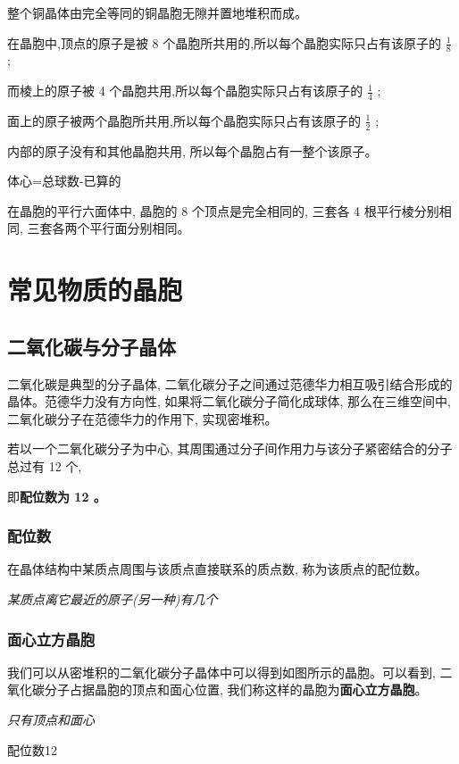 \documentclass[10pt,cn]{elegantbook}
\begin{document}
 整个铜晶体由完全等同的铜晶胞无隙并置地堆积而成。
 
 在晶胞中,顶点的原子是被 8 个晶胞所共用的,所以每个晶胞实际只占有该原子的 \(\frac{1}{8}\) ;
 
 而棱上的原子被 4 个晶胞共用,所以每个晶胞实际只占有该原子的 \(\frac{1}{4}\) ;
 
 面上的原子被两个晶胞所共用,所以每个晶胞实际只占有该原子的 \(\frac{1}{2}\) ;
 
 内部的原子没有和其他晶胞共用, 所以每个晶胞占有一整个该原子。
 
 体心=总球数-已算的
 
 在晶胞的平行六面体中, 晶胞的 8 个顶点是完全相同的, 三套各 4 根平行棱分别相同, 三套各两个平行面分别相同。
 
 
 \section{常见物质的晶胞}
 
 \subsection{二氧化碳与分子晶体}
 
 二氧化碳是典型的分子晶体, 二氧化碳分子之间通过范德华力相互吸引结合形成的晶体。范德华力没有方向性, 如果将二氧化碳分子简化成球体, 那么在三维空间中, 二氧化碳分子在范德华力的作用下, 实现密堆积。
 
 若以一个二氧化碳分子为中心, 其周围通过分子间作用力与该分子紧密结合的分子总过有 12 个,
 
 即\textbf{配位数为 12 。}
 
\subsubsection{配位数}

 在晶体结构中某质点周围与该质点直接联系的质点数, 称为该质点的配位数。
 
 \textit{某质点离它最近的原子(另一种)有几个}
 
 \subsubsection{面心立方晶胞}
 
 我们可以从密堆积的二氧化碳分子晶体中可以得到如图所示的晶胞。可以看到, 二氧化碳分子占据晶胞的顶点和面心位置, 我们称这样的晶胞为\textbf{面心立方晶胞}。
 
\textit{ 只有顶点和面心}
 
 配位数12
 
\end{document}
